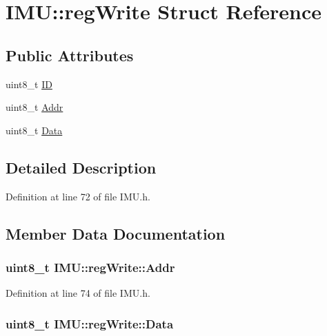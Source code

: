 \hypertarget{struct_i_m_u_1_1reg_write}{
\section{IMU::regWrite Struct Reference}
\label{struct_i_m_u_1_1reg_write}
}
\subsection*{Public Attributes}
\begin{DoxyCompactItemize}
\item 
uint8\_\-t \hyperlink{struct_i_m_u_1_1reg_write_aca32b881a20ec7adc84956176aa65a7b}{ID}
\item 
uint8\_\-t \hyperlink{struct_i_m_u_1_1reg_write_a814db0ab3fab7c9d45784c8f0eba74c5}{Addr}
\item 
uint8\_\-t \hyperlink{struct_i_m_u_1_1reg_write_ace45ec9e1c4549b73f81a62d409da7d9}{Data}
\end{DoxyCompactItemize}


\subsection{Detailed Description}


Definition at line 72 of file IMU.h.



\subsection{Member Data Documentation}
\hypertarget{struct_i_m_u_1_1reg_write_a814db0ab3fab7c9d45784c8f0eba74c5}{
\subsubsection[{Addr}]{\setlength{\rightskip}{0pt plus 5cm}uint8\_\-t {\bf IMU::regWrite::Addr}}}
\label{struct_i_m_u_1_1reg_write_a814db0ab3fab7c9d45784c8f0eba74c5}


Definition at line 74 of file IMU.h.

\hypertarget{struct_i_m_u_1_1reg_write_ace45ec9e1c4549b73f81a62d409da7d9}{
\subsubsection[{Data}]{\setlength{\rightskip}{0pt plus 5cm}uint8\_\-t {\bf IMU::regWrite::Data}}}
\label{struct_i_m_u_1_1reg_write_ace45ec9e1c4549b73f81a62d409da7d9}


